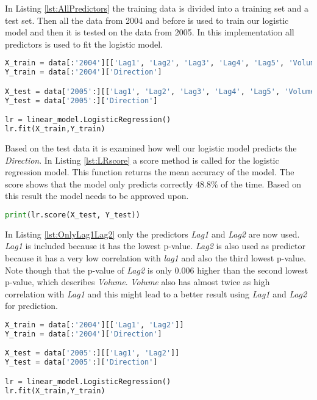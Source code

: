 In Listing \ref{lst:AllPredictors} the training data is divided into a training set and a test set. Then all the data from 2004 and before is used to train our logistic model and then it is tested on the data from 2005. In this implementation all predictors is used to fit the logistic model.

\begin{lstlisting}[language=Python, label=lst:AllPredictors, caption=Logistic regression using all predictors]
X_train = data[:'2004'][['Lag1', 'Lag2', 'Lag3', 'Lag4', 'Lag5', 'Volume']]
Y_train = data[:'2004']['Direction']

X_test = data['2005':][['Lag1', 'Lag2', 'Lag3', 'Lag4', 'Lag5', 'Volume']]
Y_test = data['2005':]['Direction']

lr = linear_model.LogisticRegression()
lr.fit(X_train,Y_train)
\end{lstlisting}

Based on the test data it is examined how well our logistic model predicts the \emph{Direction}. In Listing \ref{lst:LRscore} a score method is called for the logistic regression model. This function returns the mean accuracy of the model. The score shows that the model only predicts correctly $48.8\%$ of the time. Based on this result the model needs to be approved upon.
\begin{lstlisting}[language=Python, label=lst:LRscore, caption=Print mean accuracy]
print(lr.score(X_test, Y_test))
\end{lstlisting}

In Listing \ref{lst:OnlyLag1Lag2} only the predictors \emph{Lag1} and \emph{Lag2} are now used. \emph{Lag1} is included because it has the lowest p-value. \emph{Lag2} is also used as predictor because it has a very low correlation with \emph{lag1} and also the third lowest p-value.
Note though that the p-value of \emph{Lag2} is only 0.006 higher than the second lowest p-value, which describes \emph{Volume}. \emph{Volume} also has almost twice as high correlation with \emph{Lag1} and this might lead to a better result using \emph{Lag1} and \emph{Lag2} for prediction.

\begin{lstlisting}[language=Python, label=lst:OnlyLag1Lag2, caption=Logistic regression using only Lag1 and Lag2 as predictors]
X_train = data[:'2004'][['Lag1', 'Lag2']]
Y_train = data[:'2004']['Direction']

X_test = data['2005':][['Lag1', 'Lag2']]
Y_test = data['2005':]['Direction']

lr = linear_model.LogisticRegression()
lr.fit(X_train,Y_train)
\end{lstlisting}


